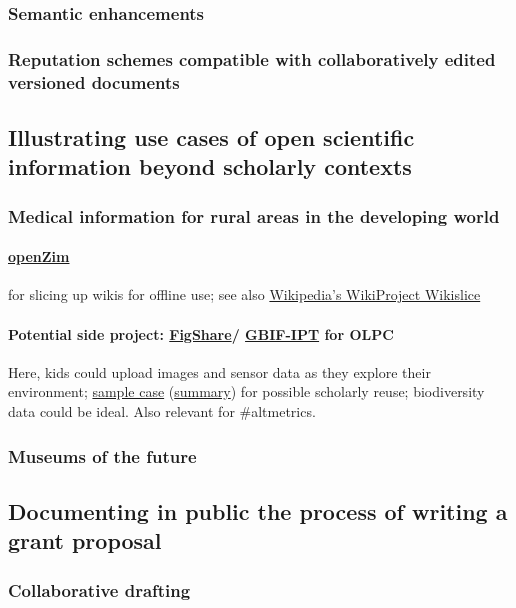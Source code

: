 \documentclass[final,authoryear,3p]{elsarticle-open-drafting}
\begin{document}
\begin{enumerate}
\subsubsection{Semantic enhancements}
\subsubsection{Reputation schemes compatible with collaboratively edited versioned documents}
\subsection{Illustrating use cases of open scientific information beyond scholarly contexts}
\subsubsection{Medical information for rural areas in the developing world}
\paragraph{\href{http://www.openzim.org}{openZim}} for slicing up wikis for offline use; see also \href{http://en.wikipedia.org/wiki/Wikipedia:WikiProject_Wikislice}{Wikipedia's WikiProject Wikislice}
\paragraph{Potential side project: \href{http://figshare.com/}{FigShare}/ \href{http://www.gbif.org/communications/news-and-events/showsingle/article/new-incentive-for-biodiversity-data-publishing/}{GBIF-IPT} for OLPC} 
Here, kids could upload images and sensor data as they explore their environment; \href{http://dx.doi.org/10.3897/zookeys.89.903}{sample case} (\href{http://www.eurekalert.org/pub_releases/2011-05/pp-snh051711.php}{summary}) for possible scholarly reuse; biodiversity data could be ideal. Also relevant for \#altmetrics.
\subsubsection{Museums of the future}
\subsection{Documenting in public the process of writing a grant proposal}
\subsubsection{Collaborative drafting}

\end{enumerate}
\end{document}
